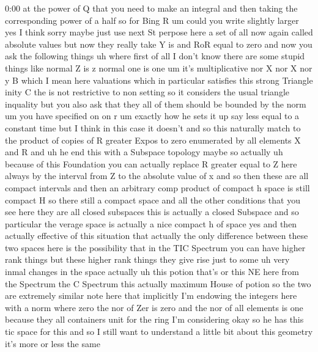 \begin{unfinished}{0:00}
at  the  power  of  Q  that  you  need  to  make
an  integral  and  then  taking  the
corresponding  power  of  a  half  so  for
Bing  R  um  could  you  write  slightly
larger  yes  I  think  sorry  maybe  just  use
next
St
perpose  here  a  set  of
all  now  again  called  absolute  values  but
now  they  really
take  Y  is  and  RoR  equal  to
zero
and  now  you  ask  the  following  things
uh  where  first  of  all  I  don't  know  there
are  some  stupid  things  like  normal  Z  is
z  normal  one  is  one  um  it's
multiplicative  nor  X  nor  X  nor  y  B  which
I  mean  here
valuations  which  in  particular  satisfies
this  strong  Triangle
inity  C  the  is  not  restrictive  to  non
setting  so  it  considers  the  usual
triangle
inquality  but  you  also  ask  that  they  all
of  them  should  be  bounded  by  the
norm  um  you  have  specified  on  on
r
um  exactly  how  he  sets  it  up  say  less
equal  to  a  constant  time  but  I  think  in
this  case  it
doesn't  and  so  this  naturally  match  to
the  product  of  copies  of  R  greater  Expos
to  zero  enumerated  by  all  elements  X  and
R  and  uh  he  end  this  with  a  Subspace
topology
maybe  so
actually  uh  because  of  this  Foundation
you  can  actually  replace  R  greater  equal
to  Z  here  always  by  the  interval  from  Z
to  the  absolute  value  of  x
and  so  then  these  are  all  compact
intervals  and  then  an  arbitrary  comp
product  of  compact  h  space  is  still
compact  H  so  there  still  a  compact
space  and  all  the  other  conditions  that
you  see  here  they  are  all  closed
subspaces  this  is  actually  a  closed
Subspace  and  so  particular  the  verage
space  is  actually  a  nice  compact  h  of
space
yes
and
then  actually  effective  of  this
situation  that  actually  the  only
difference  between  these  two  spaces  here
is  the  possibility  that  in  the  TIC
Spectrum  you  can  have  higher  rank  things
but  these  higher  rank  things  they  give
rise  just  to
some  uh  very  inmal  changes  in  the  space
actually  uh  this  potion  that's  or  this
NE  here  from  the  Spectrum  the  C  Spectrum
this  actually  maximum  House  of
potion  so  the  two  are  extremely
similar  note  here  that  implicitly  I'm
endowing  the  integers  here  with  a  norm
where  zero  the  nor  of  Zer  is  zero  and
the  nor  of  all  elements  is  one  because
they  all  containers  unit  for  the  ring
I'm
considering  okay
so  he  has  this  tic  space  for
this  and  so  I  still  want  to  understand  a
little  bit  about  this
geometry  it's  more  or  less  the  same

\end{unfinished}
